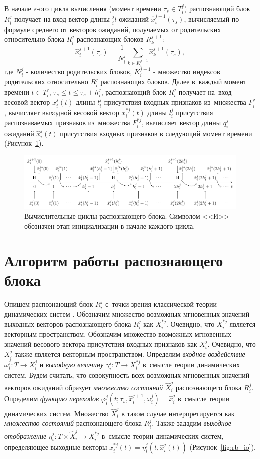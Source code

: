 \documentclass[a4paper, 12pt]{article}
\theoremstyle{plain}
\begin{document}
	В начале $s$-ого цикла вычисления (момент времени $\tau_s\in{T_i^j}$)  распознающий блок $R_i^j$ получает на вход вектор длины $_i^jl$ ожиданий $\hat{x}_i^{j+1}(\tau_s)$, вычисляемый по формуле среднего от векторов ожиданий, получаемых от родительских относительно блока $R_i^j$ распознающих блоков $R_k^{j+1}$:
	\[
	\hat{x}_i^{j+1}(\tau_s)=\frac{1}{N_i^j}\sum_{k{\in}K_i^{j+1}}\hat{x}_k^{j+1}(\tau_s),
	\]
	где $N_i^j$ - количество родительских блоков, $K_i^{j+1}$ - множество индексов родительских относительно $R_i^j$ распознающих блоков. Далее в~каждый момент времени $t\in{T_i^j}$, $\tau_s\leqslant{t}\leqslant\tau_s+h_i^j$,  распознающий блок $R_i^j$ получает на~вход весовой вектор $\bar{x}_i^j(t)$ длины $l_i^j$ присутствия входных признаков из~множества $F_i^j$, вычисляет выходной весовой вектор $\bar{x}_i^{*j}(t)$ длины $l_i^j$ присутствия распознаваемых признаков из~множества $F_i^{*j}$, вычисляет вектор длины $q_i^j$ ожиданий $\hat{x}_i^j(t)$ присутствия входных признаков в следующий момент времени (Рисунок~\ref{fig:rb_cycle}).
		
	\begin{figure}[h]
		\centering
		\includegraphics[width=1.0\linewidth]{rb_cycle}
		\caption{Вычислительные циклы распознающего блока. Символом <<И>> обозначен этап инициализации в начале каждого цикла.}
		\label{fig:rb_cycle}  
	\end{figure}
	
	\section{Алгоритм работы распознающего блока}
	Опишем распознающий блок $R_i^j$ с~точки зрения классической теории динамических систем \cite{Kalman1971}. Обозначим множество возможных мгновенных значений выходных векторов распознающего блока $R_i^j$ как $X_i^{*j}$. Очевидно, что $X_i^{*j}$ является векторным пространством. Обозначим множество возможных мгновенных значений весового вектора присутствия входных признаков как $X_i^j$. Очевидно, что $X_i^j$ также является векторным пространством. Определим \textit{входное воздействие} $\omega_i^j:T{\to}X_i^j$ и \textit{выходную величину} $\gamma_i^j:T{\to}X_i^{*j}$ в~смысле теории динамических систем. Будем считать, что совокупность всех возможных мгновенных значений векторов ожиданий образует \textit{множество состояний} $\hat{X}_i^j$ распознающего блока $R_i^j$. Определим \textit{функцию переходов} $\varphi_i^j(t;\tau_s,\hat{x}_i^{j+1},\omega_i^j)=\hat{x}_i^j$ в~смысле теории динамических систем. Множество $\hat{X}_i^j$ в таком случае интерпретируется как \textit{множество состояний} распознающего блока $R_i^j$. Также зададим \textit{выходное отображение} $\eta_i^j:T{\times}\hat{X}_i^j{\to}X_i^{*j}$ в~смысле теории динамических систем, определяющее выходные векторы $\bar{x}_i^{*j}(t)=\eta_i^j(t,\hat{x}_i^j(t))$ (Рисунок~\ref{fig:rb_io}).
	
\end{document}
